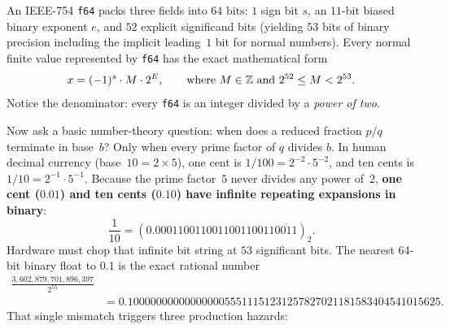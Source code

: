 An IEEE-754 \texttt{f64} packs three fields into $64\text{ bits}$: $1$ sign bit $s$, an $11$-bit biased binary exponent $e$, and $52$ explicit significand bits (yielding $53$ bits of binary precision including the implicit leading~$1$ bit for normal numbers). Every normal finite value represented by \texttt{f64} has the exact mathematical form
\[
  x = (-1)^s \cdot M \cdot 2^{E}, \qquad \text{where } M \in \mathbb{Z} \text{ and } 2^{52} \le M < 2^{53}.
\]
Notice the denominator: every \texttt{f64} is an integer divided by a \emph{power of two}.

Now ask a basic number-theory question: when does a reduced fraction $p/q$ terminate in base~$b$? Only when every prime factor of $q$ divides $b$. In human decimal currency (base~$10 = 2 \times 5$), one cent is $1/100 = 2^{-2} \cdot 5^{-2}$, and ten cents is $1/10 = 2^{-1} \cdot 5^{-1}$. Because the prime factor~$5$ never divides any power of~$2$, \textbf{one cent ($0.01$) and ten cents ($0.10$) have infinite repeating expansions in binary}:
\[
  \frac{1}{10} = (0.000110011001100110011\overline{0011})_2.
\]
Hardware must chop that infinite bit string at $53$ significant bits. The nearest 64-bit binary float to $0.1$ is the exact rational number
\begin{align*}
  \frac{3{,}602{,}879{,}701{,}896{,}397}{2^{55}} \\
  &= 0.1000000000000000055511151231257827021181583404541015625.
\end{align*}
That single mismatch triggers three production hazards:
